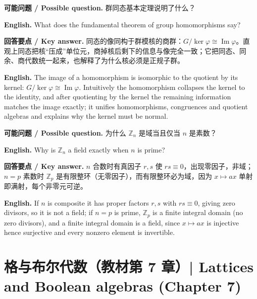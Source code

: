 \documentclass[UTF8,11pt,a4paper]{ctexart}
\newcommand{\EN}[1]{\par\noindent \textbf{English.} #1\par}
\newcommand{\ASK}[4]{\par\noindent \textbf{可能问题 / Possible question.} #1\par\EN{#2}\noindent \textbf{回答要点 / Key answer.} #3\par\EN{#4}\medskip}
\begin{document}
\ASK{群同态基本定理说明了什么？}{What does the fundamental theorem of group homomorphisms say?}{同态的像同构于群模核的商群：$G/\ker\varphi\cong\operatorname{Im}\varphi$。直观上同态把核“压成”单位元，商掉核后剩下的信息与像完全一致；它把同态、同余、商代数统一起来，也解释了为什么核必须是正规子群。}{The image of a homomorphism is isomorphic to the quotient by its kernel: $G/\ker\varphi\cong\operatorname{Im}\varphi$. Intuitively the homomorphism collapses the kernel to the identity, and after quotienting by the kernel the remaining information matches the image exactly; it unifies homomorphisms, congruences and quotient algebras and explains why the kernel must be normal.}
\ASK{为什么 $\mathbb Z_n$ 是域当且仅当 $n$ 是素数？}{Why is $\mathbb Z_n$ a field exactly when $n$ is prime?}{$n$ 合数时有真因子 $r,s$ 使 $rs\equiv0$，出现零因子，非域；$n=p$ 素数时 $\mathbb Z_p$ 是有限整环（无零因子），而有限整环必为域，因为 $x\mapsto ax$ 单射即满射，每个非零元可逆。}{If $n$ is composite it has proper factors $r,s$ with $rs\equiv0$, giving zero divisors, so it is not a field; if $n=p$ is prime, $\mathbb Z_p$ is a finite integral domain (no zero divisors), and a finite integral domain is a field, since $x\mapsto ax$ is injective hence surjective and every nonzero element is invertible.}

\section[格与布尔代数（第 7 章）]{格与布尔代数（教材第 7 章）| Lattices and Boolean algebras (Chapter 7)}
\end{document}
